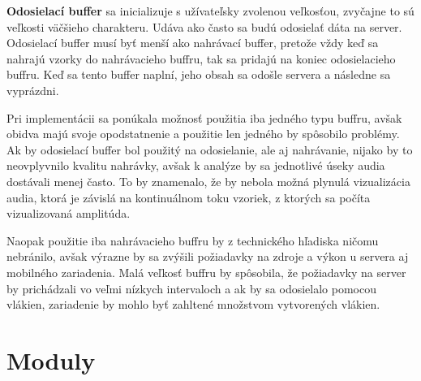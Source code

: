 \label{sending-buffer}
\textbf{Odosielací buffer} sa inicializuje s užívateľsky zvolenou veľkosťou, zvyčajne to sú veľkosti väčšieho charakteru. Udáva ako často sa budú odosielať dáta na server. Odosielací buffer musí byť menší ako nahrávací buffer, pretože vždy keď sa nahrajú vzorky do nahrávacieho buffru, tak sa pridajú na koniec odosielacieho buffru. Keď sa tento buffer naplní, jeho obsah sa odošle servera a následne sa vyprázdni.

\medskip
Pri implementácii sa ponúkala možnosť použitia iba jedného typu buffru, avšak obidva majú svoje opodstatnenie a použitie len jedného by spôsobilo problémy. Ak by odosielací buffer bol použitý na odosielanie, ale aj nahrávanie, nijako by to neovplyvnilo kvalitu nahrávky, avšak k analýze by sa  jednotlivé úseky audia dostávali menej často. To by znamenalo, že by nebola možná plynulá vizualizácia audia, ktorá je závislá na kontinuálnom toku vzoriek, z ktorých sa počíta vizualizovaná amplitúda. 

Naopak použitie iba nahrávacieho buffru by z technického hľadiska ničomu nebránilo, avšak výrazne by sa zvýšili požiadavky na zdroje a výkon u servera aj mobilného zariadenia. Malá veľkosť buffru by spôsobila, že požiadavky na server by prichádzali vo veľmi nízkych intervaloch a ak by sa odosielalo pomocou vlákien, zariadenie by mohlo byť zahltené množstvom vytvorených vlákien.

\newenvironment{pagebreakavoid}
  {\par\nobreak\vfil\penalty0\vfilneg
   \vtop\bgroup}
  {\par\xdef\tpd{\the\prevdepth}\egroup
   \prevdepth=\tpd}

\section{Moduly}


